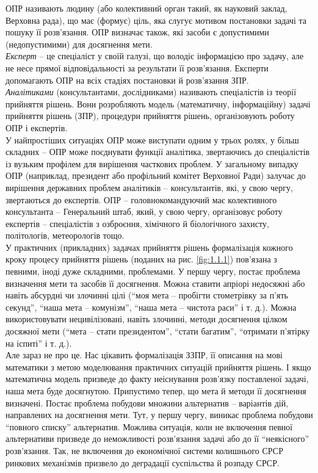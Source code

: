 ОПР називають людину (або колективний орган такий, як науковий заклад, Верховна рада), що має (формує) ціль, яка слугує мотивом постановки задачі та пошуку її розв'язання. ОПР визначає також, які засоби є допустимими (недопустимими) для досягнення мети. \\

\textit{Експерт} -- це спеціаліст у своїй галузі, що володіє інформацією про задачу, але не несе прямої відповідальності за результати її розв'язання. Експерти допомагають ОПР на всіх стадіях постановки й розв'язання ЗПР. \\

\textit{Аналітиками} (консультантами, дослідниками) називають спеціалістів із теорії прийняття рішень. Вони розробляють модель (математичну, інформаційну) задачі прийняття рішень (ЗПР), процедури прийняття рішень, організовують роботу ОПР і експертів. \\

У найпростіших ситуаціях ОПР може виступати одним у трьох ролях, у більш складних -- ОПР може поєднувати функції аналітика, звертаючись до спеціалістів із вузьким профілем для вирішення часткових проблем. У загальному випадку ОПР (наприклад, президент або профільний комітет Верховної Ради) залучає до вирішення державних проблем аналітиків -- консультантів, які, у свою чергу, звертаються до експертів. ОПР -- головнокомандуючий має колективного консультанта -- Генеральний штаб, який, у свою чергу, організовує роботу експертів -- спеціалістів з озброєння, хімічного й біологічного захисту, політологів, метеорологів тощо. \\

У практичних (прикладних) задачах прийняття рішень формалізація кожного кроку процесу прийняття рішень (поданих на рис. \ref{fig:1.1.1}) пов'язана з певними, іноді дуже складними, проблемами. У першу чергу, постає проблема визначення мети та засобів її досягнення. Можна ставити апріорі недосяжні або навіть абсурдні чи злочинні цілі (``моя мета -- пробігти стометрівку за п'ять секунд'', ``наша мета -- комунізм'', ``наша мета -- чистота раси'' і т. д.). Можна використовувати нецивілізовані, навіть злочинні, методи досягнення цілком досяжної мети (``мета -- стати президентом'', ``стати багатим'', ``отримати п'ятірку на іспиті'' і т. д.). \\

Але зараз не про це. Нас цікавить формалізація ЗЗПР, її описання на мові математики з метою моделювання практичних ситуацій прийняття рішень. І якщо математична модель призведе до факту неіснування розв'язку поставленої задачі, наша мета буде досягнутою. Припустимо тепер, що мета й методи її досягнення визначені. Постає проблема побудови множини альтернатив -- варіантів дій, направлених на досягнення мети. Тут, у першу чергу, виникає проблема побудови ``повного списку'' альтернатив. Можлива ситуація, коли не включення певної альтернативи призведе до неможливості розв'язання задачі або до її ``неякісного'' розв'язання. Так, не включення до економічної системи колишнього СРСР ринкових механізмів призвело до деградації суспільства й розпаду СРСР. \\

